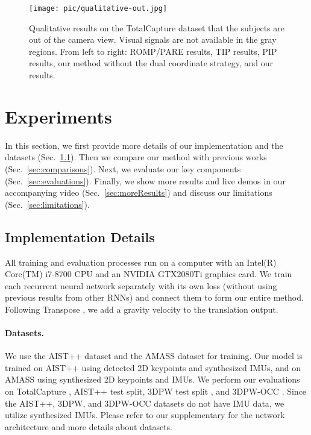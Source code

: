 
%
\begin{figure}
\texttt{[image: pic/qualitative-out.jpg]}
  \centering
  \caption{
   Qualitative results on the TotalCapture dataset that the subjects are out of the camera view. Visual signals are not available in the gray regions. From left to right: ROMP/PARE results, TIP results, PIP results, our method without the dual coordinate strategy, and our results.}
  \label{fig:comparison2}
\end{figure}
\section{Experiments}
%
In this section, we first provide more details of our implementation and the datasets (Sec.~\ref{sec:implementation}).
%
Then we compare our method with previous works (Sec.~\ref{sec:comparisons}).
%
Next, we evaluate our key components (Sec.~\ref{sec:evaluations}).
Finally, we show more results and live demos in our accompanying video (Sec.~\ref{sec:moreResults}) and discuss our limitations (Sec.~\ref{sec:limitations}).
%
\subsection{Implementation Details}\label{sec:implementation}
All training and evaluation processes run on a computer with an Intel(R) Core(TM) i7-8700 CPU and an NVIDIA GTX2080Ti graphics card.
%
We train each recurrent neural network separately with its own loss (without using previous results from other RNNs) and connect them to form our entire method.
%
Following Transpose \cite{TransPose}, we add a gravity velocity to the translation output.
%

\paragraph{Datasets.}
%
We use the AIST++ dataset \cite{AIST++} and the AMASS dataset \cite{AMASS} for training.
%
Our model is trained on AIST++ using detected 2D keypoints and synthesized IMUs, and on AMASS using synthesized 2D keypoints and IMUs.
%
We perform our evaluations on TotalCapture \cite{TotalCapture}, AIST++ test split, 3DPW test split \cite{VIP}, and 3DPW-OCC \cite{VIP, ooh2020}.
%
Since the AIST++, 3DPW, and 3DPW-OCC datasets do not have IMU data, we utilize synthesized IMUs.
%
Please refer to our supplementary for the network architecture and more details about datasets.

